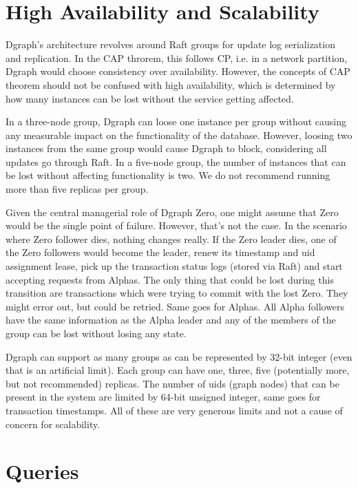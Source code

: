 \documentclass[letterpaper,twocolumn,10pt]{article}
\begin{document}
\section{High Availability and Scalability}

Dgraph's architecture revolves around Raft groups for update log serialization
and replication. In the CAP throrem, this follows CP, i.e. in a network
partition, Dgraph would choose consistency over availability. However, the
concepts of CAP theorem should not be confused with high availability, which is
determined by how many instances can be lost without the service getting
affected.

In a three-node group, Dgraph can loose one instance per group without causing
any measurable impact on the functionality of the database. However, loosing two
instances from the same group would cause Dgraph to block, considering all
updates go through Raft. In a five-node group, the number of instances that can
be lost without affecting functionality is two. We do not recommend running more
than five replicas per group.

Given the central managerial role of Dgraph Zero, one might assume that Zero
would be the single point of failure. However, that's not the case. In the
scenario where Zero follower dies, nothing changes really. If the Zero leader
dies, one of the Zero followers would become the leader, renew its timestamp and
uid assignment lease, pick up the transaction status logs (stored via Raft) and
start accepting requests from Alphas. The only thing that could be lost during
this transition are transactions which were trying to commit with the lost Zero.
They might error out, but could be retried. Same goes for Alphas. All Alpha
followers have the same information as the Alpha leader and any of the members
of the group can be lost without losing any state.

Dgraph can support as many groups as can be represented by 32-bit integer (even
that is an artificial limit). Each group can have one, three, five (potentially
more, but not recommended) replicas. The number of uids (graph nodes) that can
be present in the system are limited by 64-bit unsigned integer, same goes for
transaction timestamps. All of these are very generous limits and not a cause of
concern for scalability.

\section{Queries}
\end{document}
